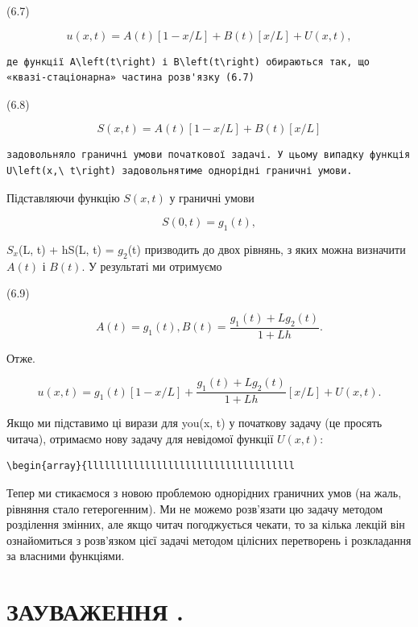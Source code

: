 \documentclass[
  ukrainian,
]{article}
\begin{document}
(6.7)

\[
u(x, t) = A(t)[1-x/L] + B(t)[x/L] + U(x, t),
\]

\begin{verbatim}
де функції A\left(t\right) і B\left(t\right) обираються так, що «квазі-стаціонарна» частина розв'язку (6.7)
\end{verbatim}

(6.8)

\[
S(x, t) = A(t)[1 - x/L] + B(t)[x/L]
\]

\begin{verbatim}
задовольняло граничні умови початкової задачі. У цьому випадку функція U\left(x,\ t\right) задовольнятиме однорідні граничні умови.
\end{verbatim}

Підставляючи функцію \(S(x, t)\) у граничні умови

\[
S(0, t) = g_1(t),
\]

\(S_x\)(L, t) + hS(L, t) = \(g_2\)(t) призводить до двох рівнянь, з яких
можна визначити \(A(t)\) і \(B(t)\). У результаті ми отримуємо

(6.9)

\[
A(t) = g_1(t), B(t) = \frac{g_1(t) + Lg_2(t)}{1 + Lh}.
\]

Отже.

\[
u(x, t) = g_1(t) [1 - x/L] + \frac{g_1(t) + Lg_2(t)}{1 + Lh} [x/L] + U(x, t).
\]

Якщо ми підставимо ці вирази для you(x, t) у початкову задачу (це
просять читача), отримаємо нову задачу для невідомої функції
\(U(x, t)\):

\begin{verbatim}
\begin{array}{llllllllllllllllllllllllllllllllllll
\end{verbatim}

Тепер ми стикаємося з новою проблемою однорідних граничних умов (на
жаль, рівняння стало гетерогенним). Ми не можемо розв'язати цю задачу
методом розділення змінних, але якщо читач погоджується чекати, то за
кілька лекцій він ознайомиться з розв'язком цієї задачі методом цілісних
перетворень і розкладання за власними функціями.

\section{ЗАУВАЖЕННЯ
.}\label{ux437ux430ux443ux432ux430ux436ux435ux43dux43dux44f-.}
\end{document}
